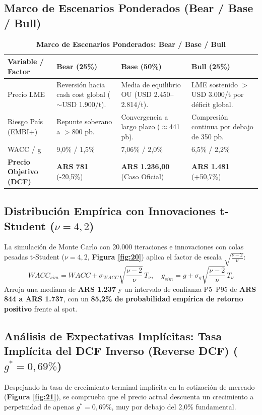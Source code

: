\documentclass[10pt,a4paper]{article}
\begin{document}
\subsection{Marco de Escenarios Ponderados (Bear / Base / Bull)}
\begin{table}[H]
\centering
\caption{\textbf{Marco de Escenarios Ponderados: Bear / Base / Bull}}
\scriptsize
\begin{tabularx}{\textwidth}{p{2.6cm}XXX}
\toprule
\textbf{Variable / Factor} & \textbf{Bear (25\%)} & \textbf{Base (50\%)} & \textbf{Bull (25\%)} \\
\midrule
Precio LME & Reversión hacia cash cost global ($\sim$USD 1.900/t). & Media de equilibrio OU (USD 2.450--2.814/t). & LME sostenido $>$\,USD 3.000/t por déficit global. \\
Riesgo País (EMBI+) & Repunte soberano a $>800$ pb. & Convergencia a largo plazo ($\approx$441 pb). & Compresión continua por debajo de 350 pb. \\
WACC / g & 9,0\% / 1,5\% & 7,06\% / 2,0\% & 6,5\% / 2,2\% \\
\midrule
\textbf{Precio Objetivo (DCF)} & \textbf{ARS 781} (-20,5\%) & \textbf{ARS 1.236,00} (Caso Oficial) & \textbf{ARS 1.481} (+50,7\%) \\
\bottomrule
\end{tabularx}
\end{table}

\subsection{Distribución Empírica con Innovaciones t-Student \texorpdfstring{($\nu=4,2$)}{(nu=4,2)}}
La simulación de Monte Carlo con 20.000 iteraciones e innovaciones con colas pesadas t-Student ($\nu = 4,2$, \textbf{Figura \ref{fig:20}}) aplica el factor de escala $\sqrt{\frac{\nu-2}{\nu}}$:
\begin{equation}
    WACC_{sim} = WACC + \sigma_{WACC} \sqrt{\frac{\nu-2}{\nu}} \, T_\nu, \quad g_{sim} = g + \sigma_g \sqrt{\frac{\nu-2}{\nu}} \, T_\nu
\end{equation}
Arroja una mediana de \textbf{ARS 1.237} y un intervalo de confianza P5--P95 de \textbf{ARS 844 a ARS 1.737}, con un \textbf{85,2\% de probabilidad empírica de retorno positivo} frente al spot.

\subsection{Análisis de Expectativas Implícitas: Tasa Implícita del DCF Inverso (Reverse DCF) \texorpdfstring{($g^* = 0,69\%$)}{(g* = 0,69\%)}}
Despejando la tasa de crecimiento terminal implícita en la cotización de mercado (\textbf{Figura \ref{fig:21}}), se comprueba que el precio actual descuenta un crecimiento a perpetuidad de apenas \textbf{$g^* = 0,69\%$}, muy por debajo del 2,0\% fundamental.
\end{document}

